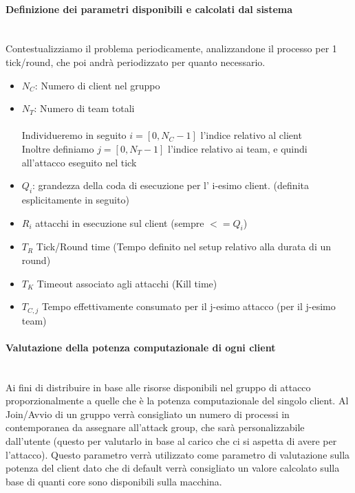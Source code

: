 \documentclass[11pt]{article}
\begin{document}
\paragraph{Definizione dei parametri disponibili e calcolati dal sistema}\mbox{}\\
Contestualizziamo il problema periodicamente, analizzandone il processo per 1 tick/round, che poi andrà periodizzato per quanto necessario.
\begin{itemize}

	\item $N_C$: Numero di client nel gruppo
	\item $N_T$: Numero di team totali\\\\
	Individueremo in seguito $i = [0,N_C-1]$ l'indice relativo al client\\
	Inoltre definiamo $j = [0, N_T-1]$ l'indice relativo ai team, e quindi all'attacco eseguito nel tick
	\item $Q_i$: grandezza della coda di esecuzione per l' i-esimo client. (definita esplicitamente in seguito)
	\item $R_i$ attacchi in esecuzione sul client (sempre $<= Q_i$)
	\item $T_R$ Tick/Round time (Tempo definito nel setup relativo alla durata di un round)
	\item $T_K$ Timeout associato agli attacchi (Kill time)
	\item $T_{C,j}$ Tempo effettivamente consumato per il j-esimo attacco (per il j-esimo team)
	
\end{itemize}
\paragraph{Valutazione della potenza computazionale di ogni client}\mbox{}\\
Ai fini di distribuire in base alle risorse disponibili nel gruppo di attacco proporzionalmente a quelle che è la potenza computazionale del singolo client. Al Join/Avvio di un gruppo verrà consigliato un numero di processi in contemporanea da assegnare all'attack group, che sarà personalizzabile dall'utente (questo per valutarlo in base al carico che ci si aspetta di avere per l'attacco). Questo parametro verrà utilizzato come parametro di valutazione sulla potenza del client dato che di default verrà consigliato un valore calcolato sulla base di quanti core sono disponibili sulla macchina.
\end{document}
